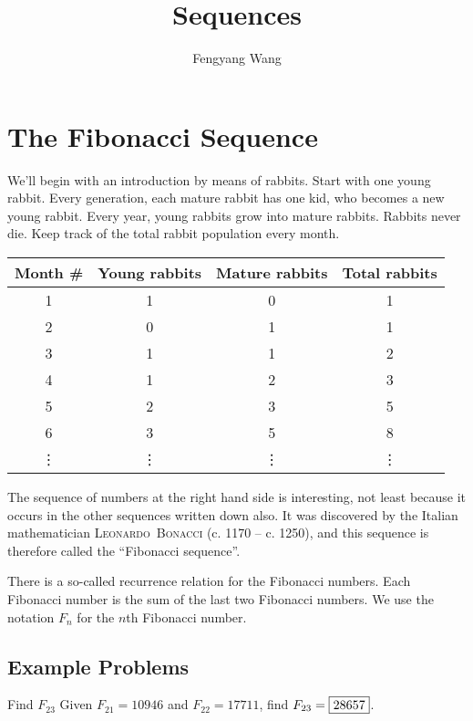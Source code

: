 \documentclass[a4paper,10pt]{report}
\title{Sequences}
\author{Fengyang Wang}
\begin{document}
\maketitle

\chapter{The Fibonacci Sequence}

We'll begin with an introduction by means of rabbits. Start with one young
rabbit. Every generation, each mature rabbit has one kid, who becomes a new
young rabbit. Every year, young rabbits grow into mature rabbits. Rabbits never
die. Keep track of the total rabbit population every month.

\begin{center}
 \begin{tabular}{|c|c|c|c|}
  \hline
  Month \# & Young rabbits & Mature rabbits & Total rabbits \\
  \hline
  1 & 1 & 0 & 1 \\
  2 & 0 & 1 & 1 \\
  3 & 1 & 1 & 2 \\
  4 & 1 & 2 & 3 \\
  5 & 2 & 3 & 5 \\
  6 & 3 & 5 & 8 \\
  \vdots & \vdots & \vdots & \vdots \\
  \hline
 \end{tabular}
\end{center}

The sequence of numbers at the right hand side is interesting, not least because
it occurs in the other sequences written down also. It was discovered by the
Italian mathematician \textsc{Leonardo~Bonacci} (c. 1170 -- c. 1250), and this
sequence is therefore called the ``Fibonacci sequence''.

There is a so-called recurrence relation for the Fibonacci numbers. Each
Fibonacci number is the sum of the last two Fibonacci numbers. We use the
notation $F_n$ for the $n$th Fibonacci number.

\section{Example Problems}

\begin{problem}{Find $F_{23}$}
 Given $F_{21}=10946$ and $F_{22}=17711$, find $F_{23}=\Ans{28657}$.
\end{problem}
\end{document}

